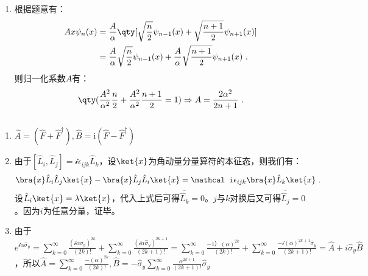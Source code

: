 
\begin{issues}
\issueDraft
\end{issues}

\subsection{ }
\begin{enumerate}
\item 根据题意有：
\begin{equation}
\begin{aligned}
Ax\psi_n(x)&=\frac{A}{\alpha}\qty[\sqrt{\frac{n}{2}}\psi_{n-1}(x)+\sqrt{\frac{n+1}{2}}\psi_{n+1}(x)] \\
&=\frac{A}{\alpha}\sqrt{\frac{n}{2}}\psi_{n-1}(x)+\frac{A}{\alpha}\sqrt{\frac{n+1}{2}}\psi_{n+1}(x)~.
\end{aligned}
\end{equation}
则归一化系数$A$有：
\begin{equation}
\qty(\frac{A^2}{{\alpha}^2}\frac{n}{2}+\frac{A^2}{{\alpha}^2}\frac{n+1}{2}=1)\Rightarrow A=\frac{2\alpha^2}{2n+1}~.
\end{equation}
\end{enumerate}
\subsection{ }
\begin{enumerate}
\item $\hat A=(\hat F+\hat F^\dagger),\hat B=\mathrm i(\hat F-\hat F^\dagger)$
\item 
由于$[\hat L_i,\hat L_j]=\mathcal i\epsilon_{ijk}\hat L_k$，设$\ket{x}$为角动量分量算符的本征态，则我们有：
\begin{equation}
\bra{x}\hat L_i\hat L_j\ket{x}-\bra{x}\hat L_j\hat L_i\ket{x}=\mathcal i\epsilon_{ijk}\bra{x}\hat L_k\ket{x}~.
\end{equation}
设$\hat L_i\ket{x}=\lambda\ket{x}$，代入上式后可得$\overline {\hat L_k}=0$。$j$与$k$对换后又可得$\overline {\hat L_j}=0$。因为$i$为任意分量，证毕。
\item 由于$e^{\mathcal i\alpha \hat {\sigma}_y}=\sum\limits^{\infty}_{k=0}\frac{(\mathcal i \alpha \hat {\sigma}_y)^{2k}}{(2k)!}+\sum\limits^{\infty}_{k=0}\frac{(\mathcal i \alpha \hat {\sigma}_y)^{2k+1}}{(2k+1)!}=\sum\limits^{\infty}_{k=0}\frac{-1） (\alpha )^{2k}}{(2k)!}+\sum\limits^{\infty}_{k=0}\frac{-\mathcal i( \alpha )^{2k+1}\hat {\sigma}_y}{(2k+1)!}=\hat A+i\hat {\sigma}_y \hat B$，所以$\hat A=\sum\limits^{\infty}_{k=0}\frac{- (\alpha )^{2k}}{(2k)!},\hat B=-\hat {\sigma}_y\sum\limits^{\infty}_{k=0}\frac{{\alpha}^{2k+1}}{(2k+1)!} \hat {\sigma}_y$
\end{enumerate}
\subsection{ }
\subsection{ }
\subsection{ }
